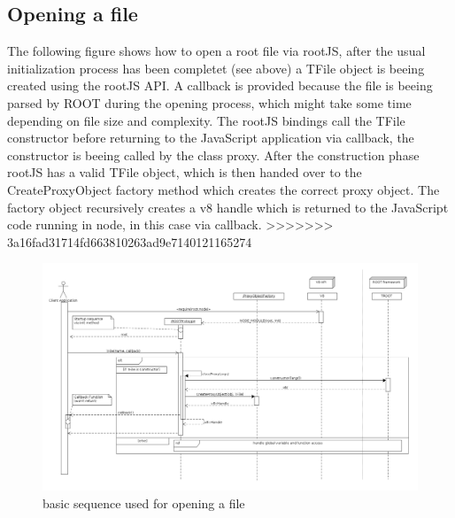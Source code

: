 \subsection{Opening a file}
The following figure shows how to open a root file via rootJS, after the usual initialization process has been completet (see above) a TFile object is beeing created using the rootJS API. A callback is provided because the file is beeing parsed by ROOT during the opening process, which might take some time depending on file size and complexity. The rootJS bindings call the TFile constructor before returning to the JavaScript application via callback, the constructor is beeing called by the class proxy. After the construction phase rootJS has a valid TFile object, which is then handed over to the CreateProxyObject factory method which creates the correct proxy object. The factory object recursively creates a v8 handle which is returned to the JavaScript code running in node, in this case via callback.
>>>>>>> 3a16fad31714fd663810263ad9e7140121165274
\begin{figure}[htb]
	\centering
	\includegraphics[width=18cm]{./latex/resources/fileOpen.png}
	\caption{basic sequence used for opening a file}
\end{figure}
